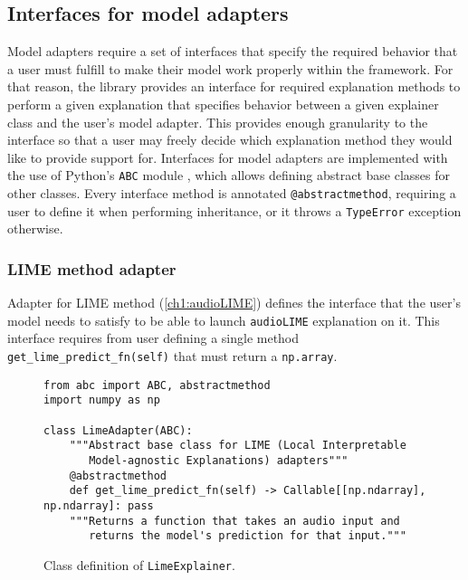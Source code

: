 \documentclass[
    bindingoffset=5mm,  %
    footnoteindent=3mm, %
    hyphenation=true    %
]{src/wut-thesis}
\begin{document}
\subsection{Interfaces for model adapters} \label{ch5:AdapterInterfaces}

    Model adapters require a set of interfaces that specify the required behavior that a user
    must fulfill to make their model work properly within the framework. For that reason, the 
    library provides an interface for required explanation methods to perform a given 
    explanation that specifies behavior
    between a given explainer class and the user’s model adapter. This provides enough 
    granularity to the interface so that a user may freely decide which explanation method 
    they would like to provide support for.
    Interfaces for model adapters are implemented with the use of
    Python’s \texttt{ABC} module \cite{pythonABC}, which allows defining abstract 
    base classes for other classes. Every interface method is annotated 
    \texttt{@abstractmethod}, requiring a user to define it when performing inheritance, or it throws a \texttt{TypeError} exception otherwise.
    
\subsubsection{LIME method adapter}

    Adapter for LIME method (\ref{ch1:audioLIME}) defines the interface that the user's model needs to satisfy to be able to launch \texttt{audioLIME} explanation on it.
    This interface requires from user defining a single method \texttt{get_lime_predict_fn(self)}
    that must return a \texttt{np.array}.

\begin{figure}%
\begin{verbatim}
from abc import ABC, abstractmethod
import numpy as np

class LimeAdapter(ABC):
    """Abstract base class for LIME (Local Interpretable
       Model-agnostic Explanations) adapters"""
    @abstractmethod
    def get_lime_predict_fn(self) -> Callable[[np.ndarray], np.ndarray]: pass
    """Returns a function that takes an audio input and
       returns the model's prediction for that input."""
\end{verbatim}
\caption{Class definition of \texttt{LimeExplainer}.}
\label{fig:LimeAdapter}
\end{figure}
\end{document}
